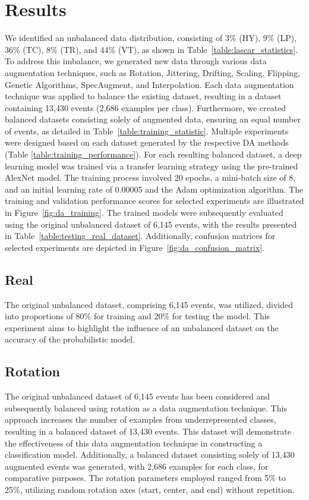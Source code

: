 \documentclass[lettersize,journal]{IEEEtran}
\begin{document}
\section{Results}\label{results}
\noindent We identified an unbalanced data distribution, consisting of 3\% (HY), 9\% (LP), 36\% (TC), 8\% (TR), and 44\% (VT), as shown in Table~\ref{table:lascar_statistics}. To address this imbalance, we generated new data through various data augmentation techniques, such as Rotation, Jittering, Drifting, Scaling, Flipping, Genetic Algorithms, SpecAugment, and Interpolation. Each data augmentation technique was applied to balance the existing dataset, resulting in a dataset containing 13,430 events (2,686 examples per class). Furthermore, we created balanced datasets consisting solely of augmented data, ensuring an equal number of events, as detailed in Table~\ref{table:training_statistic}.
Multiple experiments were designed based on each dataset generated by the respective DA methods (Table \ref{table:training_performance}). For each resulting balanced dataset, a deep learning model was trained via a transfer learning strategy using the pre-trained AlexNet model. The training process involved 20 epochs, a mini-batch size of 8, and an initial learning rate of 0.00005 and the Adam optimization algorithm. The training and validation performance scores for selected experiments are illustrated in Figure~\ref{fig:da_training}. The trained models were subsequently evaluated using the original unbalanced dataset of 6,145 events, with the results presented in Table~\ref{table:testing_real_dataset}. Additionally, confusion matrices for selected experiments are depicted in Figure~\ref{fig:da_confusion_matrix}.

\subsection{Real}
\noindent The original unbalanced dataset, comprising 6,145 events, was utilized, divided into proportions of 80\% for training and 20\% for testing the model. This experiment aims to highlight the influence of an unbalanced dataset on the accuracy of the probabilistic model.
\subsection{Rotation}
\noindent The original unbalanced dataset of 6,145 events has been considered and subsequently balanced using rotation as a data augmentation technique. This approach increases the number of examples from underrepresented classes, resulting in a balanced dataset of 13,430 events. This dataset will demonstrate the effectiveness of this data augmentation technique in constructing a classification model.
Additionally, a balanced dataset consisting solely of 13,430 augmented events was generated, with 2,686 examples for each class, for comparative purposes.
The rotation parameters employed ranged from 5\% to 25\%, utilizing random rotation axes (start, center, and end) without repetition.
\end{document}
